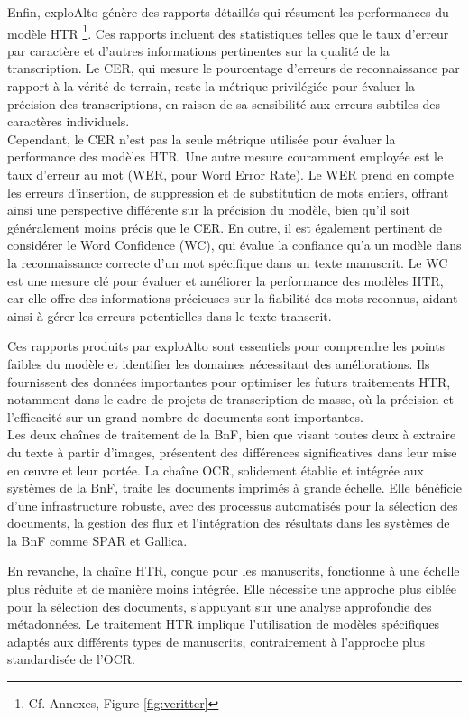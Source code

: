 \documentclass[a4paper,12pt,twoside]{book}
\begin{document}
	Enfin, exploAlto génère des rapports détaillés qui résument les performances du modèle HTR \footnote{Cf. Annexes, Figure \ref{fig:veritter}}. Ces rapports incluent des statistiques telles que le taux d’erreur par caractère et d’autres informations pertinentes sur la qualité de la transcription. Le CER, qui mesure le pourcentage d’erreurs de reconnaissance par rapport à la vérité de terrain, reste la métrique privilégiée pour évaluer la précision des transcriptions, en raison de sa sensibilité aux erreurs subtiles des caractères individuels.
	\\
	
	Cependant, le CER n’est pas la seule métrique utilisée pour évaluer la performance des modèles HTR. Une autre mesure couramment employée est le taux d’erreur au mot (WER, pour Word Error Rate). Le WER prend en compte les erreurs d’insertion, de suppression et de substitution de mots entiers, offrant ainsi une perspective différente sur la précision du modèle, bien qu’il soit généralement moins précis que le CER. En outre, il est également pertinent de considérer le Word Confidence (WC), qui évalue la confiance qu’a un modèle dans la reconnaissance correcte d’un mot spécifique dans un texte manuscrit. Le WC est une mesure clé pour évaluer et améliorer la performance des modèles HTR, car elle offre des informations précieuses sur la fiabilité des mots reconnus, aidant ainsi à gérer les erreurs potentielles dans le texte transcrit.
	
	Ces rapports produits par exploAlto sont essentiels pour comprendre les points faibles du modèle et identifier les domaines nécessitant des améliorations. Ils fournissent des données importantes pour optimiser les futurs traitements HTR, notamment dans le cadre de projets de transcription de masse, où la précision et l’efficacité sur un grand nombre de documents sont importantes.
	\\
	
	Les deux chaînes de traitement de la BnF, bien que visant toutes deux à extraire du texte à partir d'images, présentent des différences significatives dans leur mise en œuvre et leur portée. La chaîne OCR, solidement établie et intégrée aux systèmes de la BnF, traite les documents imprimés à grande échelle. Elle bénéficie d'une infrastructure robuste, avec des processus automatisés pour la sélection des documents, la gestion des flux et l'intégration des résultats dans les systèmes de la BnF comme SPAR et Gallica.
	
	En revanche, la chaîne HTR, conçue pour les manuscrits, fonctionne à une échelle plus réduite et de manière moins intégrée. Elle nécessite une approche plus ciblée pour la sélection des documents, s'appuyant sur une analyse approfondie des métadonnées. Le traitement HTR implique l'utilisation de modèles spécifiques adaptés aux différents types de manuscrits, contrairement à l'approche plus standardisée de l'OCR.
	
\end{document}
